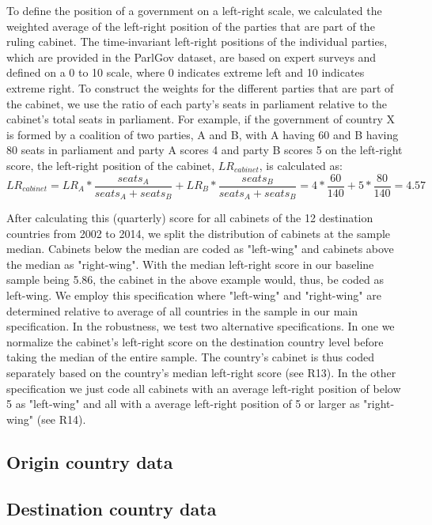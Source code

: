 \documentclass[11pt,a4paper]{scrartcl}
\begin{document}
To define the position of a government on a left-right scale, we calculated the weighted average of the left-right position of the parties that are part of the ruling cabinet. The time-invariant left-right positions of the individual parties, which are provided in the ParlGov dataset, are based on expert surveys and defined on a 0 to 10 scale, where 0 indicates extreme left and 10 indicates extreme right. To construct the weights for the different parties that are part of the cabinet, we use the ratio of each party's seats in parliament relative to the cabinet's total seats in parliament. For example, if the government of country X is formed by a coalition of two parties, A and B, with A having 60 and B having 80 seats in parliament and party A scores 4 and party B scores 5 on the left-right score, the left-right position of the cabinet, $LR_{cabinet}$, is calculated as: 
\begin{equation*}
LR_{cabinet} = LR_{A} * \frac{seats_{A}}{seats_{A} + seats_{B}} +LR_{B} * \frac{seats_{B}}{seats_{A} + seats_{B}} = 4*\frac{60}{140} +5*\frac{80}{140} = 4.57
\end{equation*}

After calculating this (quarterly) score for all cabinets of the 12 destination countries from 2002 to 2014, we split the distribution of cabinets at the sample median. Cabinets below the median are coded as "left-wing" and cabinets above the median as "right-wing". With the median left-right score in our baseline sample being 5.86, the cabinet in the above example would, thus, be coded as left-wing. We employ this specification where "left-wing" and "right-wing" are determined relative to average of all countries in the sample in our main specification. In the robustness, we test two alternative specifications. In one we normalize the cabinet's left-right score on the destination country level before taking the median of the entire sample. The country's cabinet is thus coded separately based on the country's median left-right score (see R13). In the other specification we just code all cabinets with an average left-right position of below 5 as "left-wing" and all with a average left-right position of 5 or larger as "right-wing" (see R14).

\subsection{Origin country data}

\subsection{Destination country data}
\end{document}
